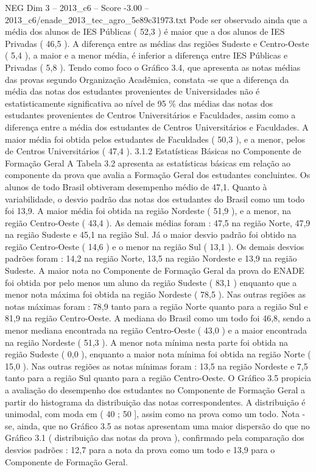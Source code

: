 \begin{textsample}{NEG Dim 3 – 2013\_c6 – Score -3.00 – 2013\_c6/enade\_2013\_tec\_agro\_5e89c31973.txt}
Pode ser observado ainda que a média dos alunos de IES Públicas ( 52,3 ) é maior que a dos alunos de IES Privadas ( 46,5 ).
A diferença entre as médias das regiões Sudeste e Centro-Oeste ( 5,4 ), a maior e a menor média, é inferior a diferença entre IES Públicas e Privadas ( 5,8 ).
Tendo como foco o Gráfico 3.4, que apresenta as notas médias das provas segundo Organização Acadêmica, constata -se que a diferença da média das notas dos estudantes provenientes de Universidades não é estatisticamente significativa ao nível de 95 \% das médias das notas dos estudantes provenientes de Centros Universitários e Faculdades, assim como a diferença entre a média dos estudantes de Centros Universitários e Faculdades.
A maior média foi obtida pelos estudantes de Faculdades ( 50,3 ), e a menor, pelos de Centros Universitários ( 47,4 ). 3.1.2 Estatísticas Básicas no Componente de Formação Geral A Tabela 3.2 apresenta as estatísticas básicas em relação ao componente da prova que avalia a Formação Geral dos estudantes concluintes.
Os alunos de todo Brasil obtiveram desempenho médio de 47,1.
Quanto à variabilidade, o desvio padrão das notas dos estudantes do Brasil como um todo foi 13,9.
A maior média foi obtida na região Nordeste ( 51,9 ), e a menor, na região Centro-Oeste ( 43,4 ).
As demais médias foram : 47,5 na região Norte, 47,9 na região Sudeste e 45,1 na região Sul.
Já o maior desvio padrão foi obtido na região Centro-Oeste ( 14,6 ) e o menor na região Sul ( 13,1 ).
Os demais desvios padrões foram : 14,2 na região Norte, 13,5 na região Nordeste e 13,9 na região Sudeste.
A maior nota no Componente de Formação Geral da prova do ENADE foi obtida por pelo menos um aluno da região Sudeste ( 83,1 ) enquanto que a menor nota máxima foi obtida na região Nordeste ( 78,5 ).
Nas outras regiões as notas máximas foram : 78,9 tanto para a região Norte quanto para a região Sul e 81,9 na região Centro-Oeste.
A mediana do Brasil como um todo foi 46,8, sendo a menor mediana encontrada na região Centro-Oeste ( 43,0 ) e a maior encontrada na região Nordeste ( 51,3 ).
A menor nota mínima nesta parte foi obtida na região Sudeste ( 0,0 ), enquanto a maior nota mínima foi obtida na região Norte ( 15,0 ).
Nas outras regiões as notas mínimas foram : 13,5 na região Nordeste e 7,5 tanto para a região Sul quanto para a região Centro-Oeste.
O Gráfico 3.5 propicia a avaliação do desempenho dos estudantes no Componente de Formação Geral a partir do histograma da distribuição das notas correspondentes.
A distribuição é unimodal, com moda em ( 40 ; 50 ], assim como na prova como um todo.
Nota -se, ainda, que no Gráfico 3.5 as notas apresentam uma maior dispersão do que no Gráfico 3.1 ( distribuição das notas da prova ), confirmado pela comparação dos desvios padrões : 12,7 para a nota da prova como um todo e 13,9 para o Componente de Formação Geral.

\end{textsample}
